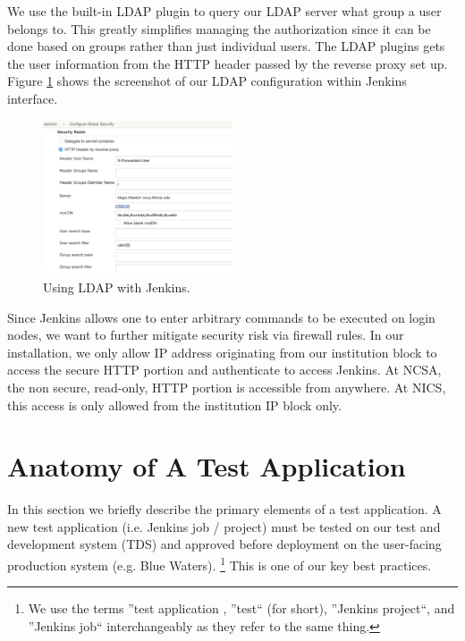 \documentclass[10pt, conference, compsocconf]{IEEEtran}
\begin{document}
We use the built-in LDAP plugin to query our LDAP server what group a user belongs to.
This greatly simplifies managing the authorization since it can be done based on groups rather than just individual users. 
The LDAP plugins gets the user information from the HTTP header passed by the reverse proxy set up. 
Figure \ref{fig:LDAP-Jenkins} shows the screenshot of our LDAP configuration within Jenkins interface.

\begin{figure}
\centering
\includegraphics[width=0.5\textwidth]{LDAP-Jenkins}
\caption{Using LDAP with Jenkins.}
\label{fig:LDAP-Jenkins}
\end{figure}

Since Jenkins allows one to enter arbitrary commands to be executed on login nodes, we want to further mitigate security risk via firewall rules. 
In our installation, we only allow IP address originating from our institution block to access the secure HTTP portion and authenticate to access Jenkins. 
At NCSA, the non secure, read-only, HTTP portion is accessible from anywhere. 
At NICS, this access is only allowed from the institution IP block only. 


\section{Anatomy of A Test Application}
\label{sec:TestAnatomy}
In this section we briefly describe the primary elements of a test application. 
A new test application (i.e. Jenkins job / project) must be tested on our test and development system (TDS) and approved before deployment on the user-facing production system (e.g. Blue Waters). 
\footnote{We use the terms ''test application , ''test`` (for short), ''Jenkins project``, and ''Jenkins job`` interchangeably as they refer to the same thing.}
This is one of our key best practices. 
\end{document}
